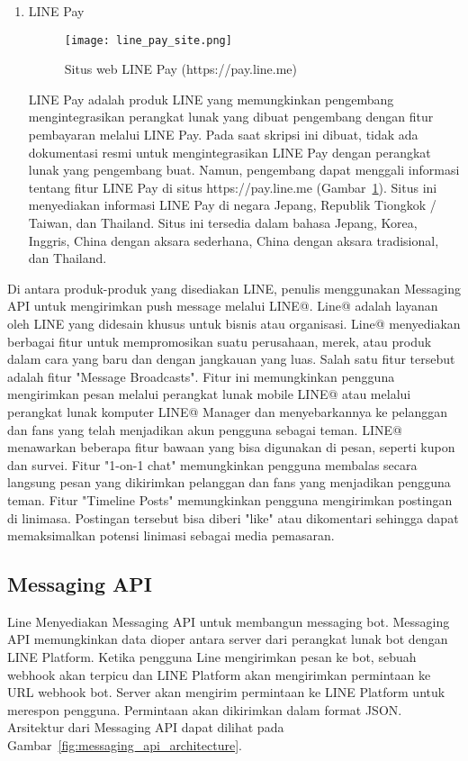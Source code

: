 \begin{enumerate}
\item LINE Pay
\begin{figure}[H]
	\centering  
	\texttt{[image: line\_pay\_site.png]}  
	\caption[Situs web LINE Pay]{Situs web LINE Pay (https://pay.line.me)} 
	\label{fig:line_pay_site} 
\end{figure}

LINE Pay adalah produk LINE yang memungkinkan pengembang mengintegrasikan perangkat lunak yang dibuat pengembang dengan fitur pembayaran melalui LINE Pay. Pada saat skripsi ini dibuat, tidak ada dokumentasi resmi untuk mengintegrasikan LINE Pay dengan perangkat lunak yang pengembang buat. Namun, pengembang dapat menggali informasi tentang fitur LINE Pay di situs https://pay.line.me (Gambar~\ref{fig:line_pay_site}). Situs ini menyediakan informasi LINE Pay di negara Jepang, Republik Tiongkok / Taiwan, dan Thailand. Situs ini tersedia dalam bahasa Jepang, Korea, Inggris, China dengan aksara sederhana, China dengan aksara tradisional, dan Thailand.

\end{enumerate}

Di antara produk-produk yang disediakan LINE, penulis menggunakan Messaging API untuk mengirimkan push message melalui LINE@. Line@ adalah layanan oleh LINE yang didesain khusus untuk bisnis atau organisasi. Line@ menyediakan berbagai fitur untuk mempromosikan suatu perusahaan, merek, atau produk dalam cara yang baru dan dengan jangkauan yang luas. Salah satu fitur tersebut adalah fitur "Message Broadcasts". Fitur ini memungkinkan pengguna mengirimkan pesan melalui perangkat lunak mobile LINE@ atau melalui perangkat lunak komputer LINE@ Manager dan menyebarkannya ke pelanggan dan fans yang telah menjadikan akun pengguna sebagai teman. LINE@ menawarkan beberapa fitur bawaan yang bisa digunakan di pesan, seperti kupon dan survei. Fitur "1-on-1 chat" memungkinkan pengguna membalas secara langsung pesan yang dikirimkan pelanggan dan fans yang menjadikan pengguna teman. Fitur "Timeline Posts" memungkinkan pengguna mengirimkan postingan di linimasa. Postingan tersebut bisa diberi "like" atau dikomentari sehingga dapat memaksimalkan potensi linimasi sebagai media pemasaran.

\subsection{Messaging API } 
Line Menyediakan Messaging API untuk membangun messaging bot. Messaging API memungkinkan data dioper antara server dari perangkat lunak bot dengan LINE Platform. Ketika pengguna Line mengirimkan pesan ke bot, sebuah webhook akan terpicu dan LINE Platform akan mengirimkan permintaan ke URL webhook bot. Server akan mengirim permintaan ke LINE Platform untuk merespon pengguna. Permintaan akan dikirimkan dalam format JSON. Arsitektur dari Messaging API dapat dilihat pada Gambar~\ref{fig:messaging_api_architecture}.

